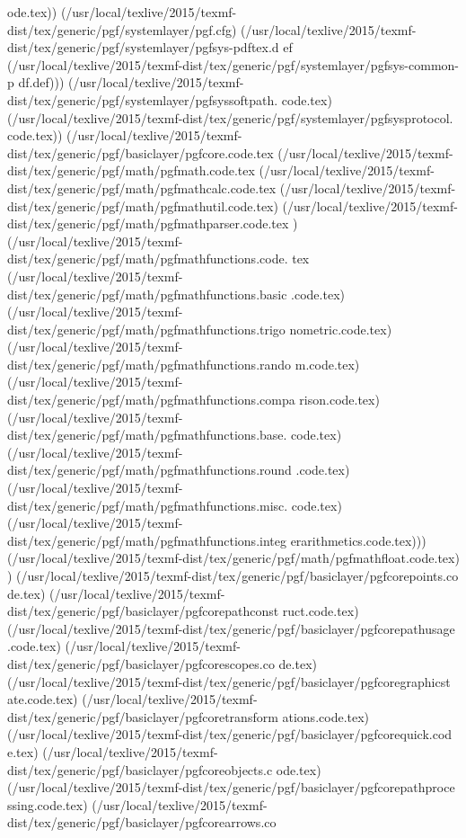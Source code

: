 ode.tex))
(/usr/local/texlive/2015/texmf-dist/tex/generic/pgf/systemlayer/pgf.cfg)
(/usr/local/texlive/2015/texmf-dist/tex/generic/pgf/systemlayer/pgfsys-pdftex.d
ef
(/usr/local/texlive/2015/texmf-dist/tex/generic/pgf/systemlayer/pgfsys-common-p
df.def)))
(/usr/local/texlive/2015/texmf-dist/tex/generic/pgf/systemlayer/pgfsyssoftpath.
code.tex)
(/usr/local/texlive/2015/texmf-dist/tex/generic/pgf/systemlayer/pgfsysprotocol.
code.tex))
(/usr/local/texlive/2015/texmf-dist/tex/generic/pgf/basiclayer/pgfcore.code.tex
(/usr/local/texlive/2015/texmf-dist/tex/generic/pgf/math/pgfmath.code.tex
(/usr/local/texlive/2015/texmf-dist/tex/generic/pgf/math/pgfmathcalc.code.tex
(/usr/local/texlive/2015/texmf-dist/tex/generic/pgf/math/pgfmathutil.code.tex)
(/usr/local/texlive/2015/texmf-dist/tex/generic/pgf/math/pgfmathparser.code.tex
)
(/usr/local/texlive/2015/texmf-dist/tex/generic/pgf/math/pgfmathfunctions.code.
tex
(/usr/local/texlive/2015/texmf-dist/tex/generic/pgf/math/pgfmathfunctions.basic
.code.tex)
(/usr/local/texlive/2015/texmf-dist/tex/generic/pgf/math/pgfmathfunctions.trigo
nometric.code.tex)
(/usr/local/texlive/2015/texmf-dist/tex/generic/pgf/math/pgfmathfunctions.rando
m.code.tex)
(/usr/local/texlive/2015/texmf-dist/tex/generic/pgf/math/pgfmathfunctions.compa
rison.code.tex)
(/usr/local/texlive/2015/texmf-dist/tex/generic/pgf/math/pgfmathfunctions.base.
code.tex)
(/usr/local/texlive/2015/texmf-dist/tex/generic/pgf/math/pgfmathfunctions.round
.code.tex)
(/usr/local/texlive/2015/texmf-dist/tex/generic/pgf/math/pgfmathfunctions.misc.
code.tex)
(/usr/local/texlive/2015/texmf-dist/tex/generic/pgf/math/pgfmathfunctions.integ
erarithmetics.code.tex)))
(/usr/local/texlive/2015/texmf-dist/tex/generic/pgf/math/pgfmathfloat.code.tex)
)
(/usr/local/texlive/2015/texmf-dist/tex/generic/pgf/basiclayer/pgfcorepoints.co
de.tex)
(/usr/local/texlive/2015/texmf-dist/tex/generic/pgf/basiclayer/pgfcorepathconst
ruct.code.tex)
(/usr/local/texlive/2015/texmf-dist/tex/generic/pgf/basiclayer/pgfcorepathusage
.code.tex)
(/usr/local/texlive/2015/texmf-dist/tex/generic/pgf/basiclayer/pgfcorescopes.co
de.tex)
(/usr/local/texlive/2015/texmf-dist/tex/generic/pgf/basiclayer/pgfcoregraphicst
ate.code.tex)
(/usr/local/texlive/2015/texmf-dist/tex/generic/pgf/basiclayer/pgfcoretransform
ations.code.tex)
(/usr/local/texlive/2015/texmf-dist/tex/generic/pgf/basiclayer/pgfcorequick.cod
e.tex)
(/usr/local/texlive/2015/texmf-dist/tex/generic/pgf/basiclayer/pgfcoreobjects.c
ode.tex)
(/usr/local/texlive/2015/texmf-dist/tex/generic/pgf/basiclayer/pgfcorepathproce
ssing.code.tex)
(/usr/local/texlive/2015/texmf-dist/tex/generic/pgf/basiclayer/pgfcorearrows.co
